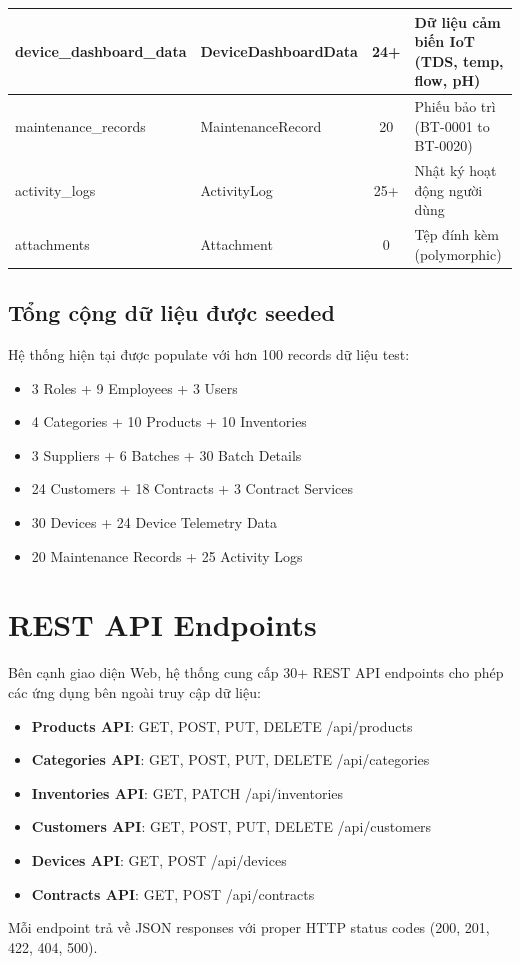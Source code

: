 \begin{table}[H]
\begin{tabularx}{\textwidth}{|l|l|c|X|}
device\_dashboard\_data & DeviceDashboardData & 24+ & Dữ liệu cảm biến IoT (TDS, temp, flow, pH) \\
\hline

maintenance\_records & MaintenanceRecord & 20 & Phiếu bảo trì (BT-0001 to BT-0020) \\
\hline

activity\_logs & ActivityLog & 25+ & Nhật ký hoạt động người dùng \\
\hline

attachments & Attachment & 0 & Tệp đính kèm (polymorphic) \\
\hline

\end{tabularx}

\end{table}

\subsection*{Tổng cộng dữ liệu được seeded}

Hệ thống hiện tại được populate với hơn 100 records dữ liệu test:

\begin{itemize}
    \item 3 Roles + 9 Employees + 3 Users
    \item 4 Categories + 10 Products + 10 Inventories
    \item 3 Suppliers + 6 Batches + 30 Batch Details
    \item 24 Customers + 18 Contracts + 3 Contract Services
    \item 30 Devices + 24 Device Telemetry Data
    \item 20 Maintenance Records + 25 Activity Logs
\end{itemize}

\section{REST API Endpoints}

Bên cạnh giao diện Web, hệ thống cung cấp 30+ REST API endpoints cho phép các ứng dụng bên ngoài truy cập dữ liệu:

\begin{itemize}
    \item \textbf{Products API}: GET, POST, PUT, DELETE /api/products
    \item \textbf{Categories API}: GET, POST, PUT, DELETE /api/categories
    \item \textbf{Inventories API}: GET, PATCH /api/inventories
    \item \textbf{Customers API}: GET, POST, PUT, DELETE /api/customers
    \item \textbf{Devices API}: GET, POST /api/devices
    \item \textbf{Contracts API}: GET, POST /api/contracts
\end{itemize}

Mỗi endpoint trả về JSON responses với proper HTTP status codes (200, 201, 422, 404, 500).

